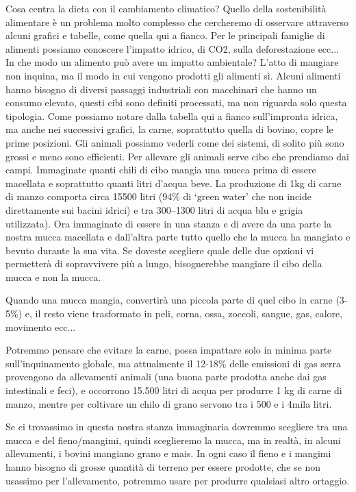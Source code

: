 \documentclass[12pt]{book} %
\begin{document}
Cosa centra la dieta con il cambiamento climatico? Quello della sostenibilità alimentare è un problema molto complesso che cercheremo di osservare attraverso alcuni grafici e tabelle, come quella qui a fianco. Per le principali famiglie di alimenti possiamo conoscere l'impatto idrico, di CO2, sulla deforestazione ecc... In che modo un alimento può avere un impatto ambientale? L'atto di mangiare non inquina, ma il modo in cui vengono prodotti gli alimenti sì. Alcuni alimenti hanno bisogno di diversi passaggi industriali con macchinari che hanno un consumo elevato, questi cibi sono definiti processati, ma non riguarda solo questa tipologia. Come possiamo notare dalla tabella qui a fianco sull'impronta idrica, ma anche nei successivi grafici, la carne, soprattutto quella di bovino, copre le prime posizioni. Gli animali possiamo vederli come dei sistemi, di solito più sono grossi e meno sono efficienti. Per allevare gli animali serve cibo che prendiamo dai campi. Immaginate quanti chili di cibo mangia una mucca prima di essere macellata e soprattutto quanti litri d'acqua beve. La produzione di 1kg di carne di manzo comporta circa 15500 litri (94\% di ‘green water’ che non incide direttamente sui bacini idrici) e tra 300–1300 litri di acqua blu e grigia utilizzata). Ora immaginate di essere in una stanza e di avere da una parte
la nostra mucca macellata e dall'altra parte tutto quello che la mucca ha mangiato e bevuto durante la sua vita.
Se doveste scegliere quale delle due opzioni vi permetterà di sopravvivere più a lungo, bisognerebbe mangiare il cibo della mucca e non la mucca.

Quando una mucca mangia, convertirà una piccola parte di quel cibo in carne (3-5\%) e, il resto viene trasformato in peli, corna, ossa, zoccoli, sangue, gas, calore, movimento ecc...

Potremmo pensare che evitare la carne, possa impattare solo in minima parte sull'inquinamento globale, ma attualmente il 12-18\% delle emissioni di gas serra provengono da allevamenti animali
(una buona parte prodotta anche dai gas intestinali e feci), e occorrono 15.500 litri di acqua per produrre 1 kg di carne di manzo, mentre per coltivare un chilo di grano servono tra i 500 e i 4mila litri.

Se ci trovassimo in questa nostra stanza immaginaria dovremmo scegliere tra una mucca e del fieno/mangimi,
quindi sceglieremo la mucca, ma in realtà, in alcuni allevamenti, i bovini mangiano grano e mais.
In ogni caso il fieno e i mangimi hanno bisogno di grosse quantità di terreno per essere prodotte, che se non usassimo per
l'allevamento, potremmo usare per produrre qualsiasi altro ortaggio.
\end{document}
